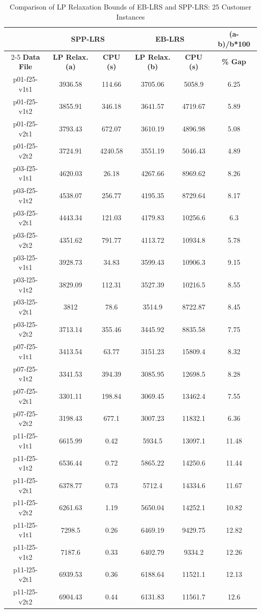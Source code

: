 \begin{table}[!hbp]
\centering
\caption{Comparison of LP Relaxation Bounds of EB-LRS and SPP-LRS: 25 Customer Instances}\label{comparesp-eb-gr1}
\begin {tabular}[t]{|c|c|c|c|c|c|}\hline
\mbox{}	&  \multicolumn{2}{|c|}{{\bf SPP-LRS}} & \multicolumn{2}{|c|}{{\bf EB-LRS}}	&	{\bf (a-b)/b*100}	\\\cline{2-5}
{\bf Data File}	& {\bf LP Relax. (a)}	& {\bf CPU (s)} & {\bf LP Relax. (b)}	&  {\bf CPU (s)} & {\bf \% Gap}	\\\hline 
p01-f25-v1t1	&	3936.58	&	114.66	&	3705.06	&	5058.9	&	6.25	\\
p01-f25-v1t2	&	3855.91	&	346.18	&	3641.57	&	4719.67	&	5.89	\\
p01-f25-v2t1	&	3793.43	&	672.07	&	3610.19	&	4896.98	&	5.08	\\
p01-f25-v2t2	&	3724.91	&	4240.58	&	3551.19	&	5046.43	&	4.89	\\
p03-f25-v1t1	&	4620.03	&	26.18	&	4267.66	&	8969.62	&	8.26	\\
p03-f25-v1t2	&	4538.07	&	256.77	&	4195.35	&	8729.64	&	8.17	\\
p03-f25-v2t1	&	4443.34	&	121.03	&	4179.83	&	10256.6	&	6.3	\\
p03-f25-v2t2	&	4351.62	&	791.77	&	4113.72	&	10934.8	&	5.78	\\
p03-l25-v1t1	&	3928.73	&	34.83	&	3599.43	&	10906.3	&	9.15	\\
p03-l25-v1t2	&	3829.09	&	112.31	&	3527.39	&	10216.5	&	8.55	\\
p03-l25-v2t1	&	3812	&	78.6	&	3514.9	&	8722.87	&	8.45	\\
p03-l25-v2t2	&	3713.14	&	355.46	&	3445.92	&	8835.58	&	7.75	\\
p07-f25-v1t1	&	3413.54	&	63.77	&	3151.23	&	15809.4	&	8.32	\\
p07-f25-v1t2	&	3341.53	&	394.39	&	3085.95	&	12698.5	&	8.28	\\
p07-f25-v2t1	&	3301.11	&	198.84	&	3069.45	&	13462.4	&	7.55	\\
p07-f25-v2t2	&	3198.43	&	677.1	&	3007.23	&	11832.1	&	6.36	\\
p11-f25-v1t1	&	6615.99	&	0.42	&	5934.5	&	13097.1	&	11.48	\\
p11-f25-v1t2	&	6536.44	&	0.72	&	5865.22	&	14250.6	&	11.44	\\
p11-f25-v2t1	&	6378.77	&	0.73	&	5712.4	&	14334.6	&	11.67	\\
p11-f25-v2t2	&	6261.63	&	1.19	&	5650.04	&	14252.1	&	10.82	\\
p11-l25-v1t1	&	7298.5	&	0.26	&	6469.19	&	9429.75	&	12.82	\\
p11-l25-v1t2	&	7187.6	&	0.33	&	6402.79	&	9334.2	&	12.26	\\
p11-l25-v2t1	&	6939.53	&	0.36	&	6188.64	&	11521.1	&	12.13	\\
p11-l25-v2t2	&	6904.43	&	0.44	&	6131.83	&	11561.7	&	12.6	\\\hline
\end{tabular}
\end{table}

